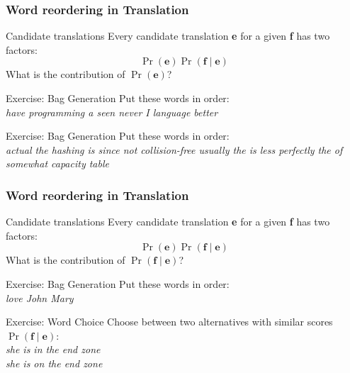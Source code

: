\begin{frame}
\frametitle{Word reordering in Translation}
\begin{block}{Candidate translations}
Every candidate translation \textbf{e} for a given \textbf{f} has two factors:
\[ \Pr( \textbf{e} ) \Pr( \textbf{f} \mid \textbf{e} ) \]
What is the contribution of $\Pr(\textbf{e})$?
\end{block}\pause
\begin{alertblock}{Exercise: Bag Generation}
Put these words in order:\\
\textit{have programming a seen never I language better}
\end{alertblock}\pause
\begin{alertblock}{Exercise: Bag Generation}
Put these words in order:\\
\textit{actual the hashing is since not collision-free usually the is less perfectly the of somewhat capacity table}
\end{alertblock}
\end{frame}

\begin{frame}
\frametitle{Word reordering in Translation}
\begin{block}{Candidate translations}
Every candidate translation \textbf{e} for a given \textbf{f} has two factors:
\[ \Pr( \textbf{e} ) \Pr( \textbf{f} \mid \textbf{e} ) \]
What is the contribution of $\Pr( \textbf{f} \mid \textbf{e} )$?
\end{block}\pause
\begin{alertblock}{Exercise: Bag Generation}
Put these words in order:\\
\textit{love John Mary}
\end{alertblock}
\begin{alertblock}{Exercise: Word Choice}
Choose between two alternatives with similar scores $\Pr( \textbf{f} \mid \textbf{e} )$:\\
\textit{she is in the end zone} \\
\textit{she is on the end zone} 
\end{alertblock}
\end{frame}

